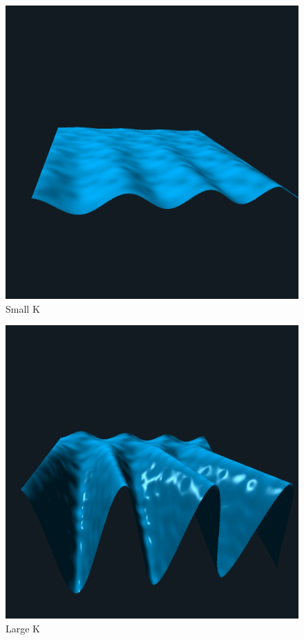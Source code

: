 \documentclass[12pt,letterpaper]{article}
\begin{document}
\begin{figure}[!h]
    \centering
    \includegraphics[width=1.0\textwidth]{img/small_k.png}
    \caption{Small K}
\end{figure}

\begin{figure}[!h]
    \centering
    \includegraphics[width=1.0\textwidth]{img/large_k.png}
    \caption{Large K}
\end{figure}
\end{document}
